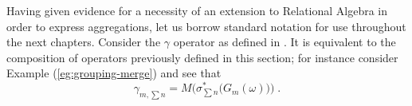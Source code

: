 Having given evidence for a necessity of an extension to Relational Algebra in order to express aggregations, let us borrow standard notation for use throughout the next chapters.
Consider the $\gamma$ operator as defined in \cite[\S 5.2.4]{db-systems}.
It is equivalent to the composition of operators previously defined in this section; for instance consider Example (\ref{eg:grouping-merge}) and see that
$$\gamma_{m, \sum n} = M\Big(\sigma^*_{\sum n} \big( G_m(\omega) \big) \Big) \; .$$
